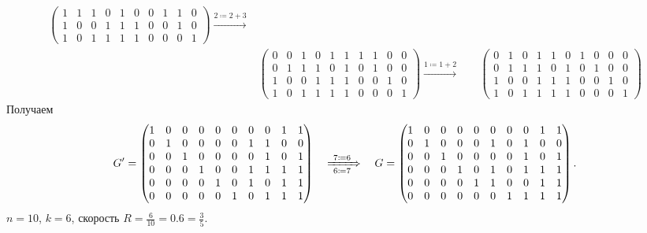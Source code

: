 \documentclass{article}
\begin{document}
\begin{align*}
\begin{pmatrix}
        1 & 1 & 1 & 0 & 1 & 0 & 0 & 1 & 1 & 0 \\
        1 & 0 & 0 & 1 & 1 & 1 & 0 & 0 & 1 & 0 \\
        1 & 0 & 1 & 1 & 1 & 1 & 0 & 0 & 0 & 1
    \end{pmatrix}
    \xrightarrow{2\coloneqq2+3}\\
    &\begin{pmatrix}
        0 & 0 & 1 & 0 & 1 & 1 & 1 & 1 & 0 & 0 \\
        0 & 1 & 1 & 1 & 0 & 1 & 0 & 1 & 0 & 0 \\
        1 & 0 & 0 & 1 & 1 & 1 & 0 & 0 & 1 & 0 \\
        1 & 0 & 1 & 1 & 1 & 1 & 0 & 0 & 0 & 1
    \end{pmatrix}
    \xrightarrow{1\coloneqq1+2}\
    &&\begin{pmatrix}
        0 & 1 & 0 & 1 & 1 & 0 & 1 & 0 & 0 & 0 \\
        0 & 1 & 1 & 1 & 0 & 1 & 0 & 1 & 0 & 0 \\
        1 & 0 & 0 & 1 & 1 & 1 & 0 & 0 & 1 & 0 \\
        1 & 0 & 1 & 1 & 1 & 1 & 0 & 0 & 0 & 1
    \end{pmatrix}
\end{align*}
Получаем
\[
    G' =
    \begin{pmatrix}
        1 & 0 & 0 & 0 & 0 & 0 & 0 & 0 & 1 & 1 \\
        0 & 1 & 0 & 0 & 0 & 0 & 1 & 1 & 0 & 0 \\
        0 & 0 & 1 & 0 & 0 & 0 & 0 & 1 & 0 & 1 \\
        0 & 0 & 0 & 1 & 0 & 0 & 1 & 1 & 1 & 1 \\
        0 & 0 & 0 & 0 & 1 & 0 & 1 & 0 & 1 & 1 \\
        0 & 0 & 0 & 0 & 0 & 1 & 0 & 1 & 1 & 1 \\
    \end{pmatrix}
    \quad
    \xRightarrow[~6\coloneqq7~]{~7\coloneqq6~}
    \quad
    G =
    \begin{pmatrix}
        1 & 0 & 0 & 0 & 0 & 0 & 0 & 0 & 1 & 1 \\
        0 & 1 & 0 & 0 & 0 & 1 & 0 & 1 & 0 & 0 \\
        0 & 0 & 1 & 0 & 0 & 0 & 0 & 1 & 0 & 1 \\
        0 & 0 & 0 & 1 & 0 & 1 & 0 & 1 & 1 & 1 \\
        0 & 0 & 0 & 0 & 1 & 1 & 0 & 0 & 1 & 1 \\
        0 & 0 & 0 & 0 & 0 & 0 & 1 & 1 & 1 & 1 \\
    \end{pmatrix}
    \text{.}
\]
$n = 10$, $k = 6$, скорость $R=\frac{6}{10}=0.6=\frac{3}{5}$.
\end{document}
